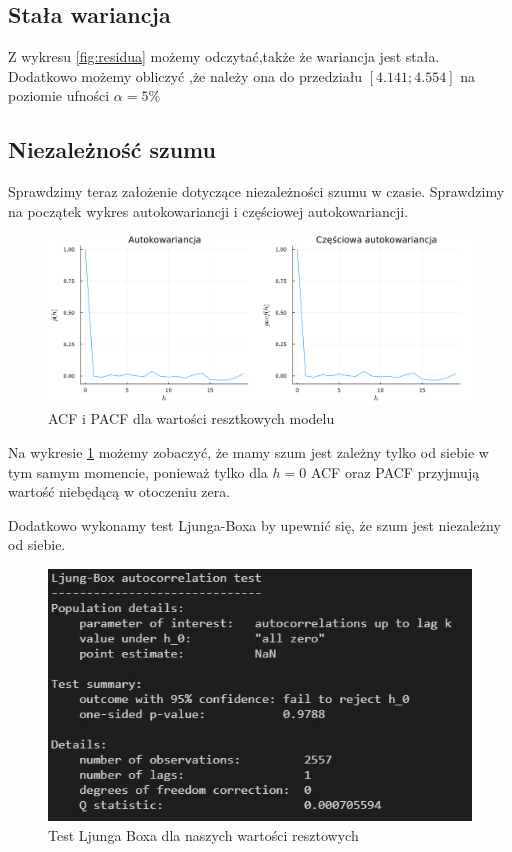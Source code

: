 \documentclass[12pt]{article}
\begin{document}
\subsection{Stała wariancja}
Z wykresu \ref{fig:residua} możemy odczytać,także że wariancja jest stała. Dodatkowo możemy obliczyć ,że  należy ona do przedziału $[4.141 ; 4.554]$ na poziomie ufności $\alpha = 5\%$

\subsection{Niezależność szumu}
Sprawdzimy teraz założenie dotyczące niezależności szumu w czasie. Sprawdzimy na początek wykres autokowariancji i częściowej autokowariancji. 
\begin{figure}[H]
	\centering
	\includegraphics[width=3\columnwidth/4]{img/acf_pacf_residua.png}
	\caption{ACF i PACF dla wartości resztkowych modelu}
	\label{fig:residua_acf_pacf}
\end{figure}
Na wykresie \ref{fig:residua_acf_pacf} możemy  zobaczyć, że mamy szum jest zależny tylko od siebie w tym samym momencie, ponieważ tylko dla $h=0$ ACF oraz PACF przyjmują wartość niebędącą w otoczeniu zera.

Dodatkowo wykonamy test Ljunga-Boxa by upewnić się, że szum jest niezależny od siebie. 
\begin{figure}[H]
	\centering
	\includegraphics[width=3\columnwidth/4]{img/Ljung-Box.png}
	\caption{Test Ljunga Boxa dla naszych wartości resztowych}
	\label{Test Ljunga Boxa}
\end{figure}
\end{document}
